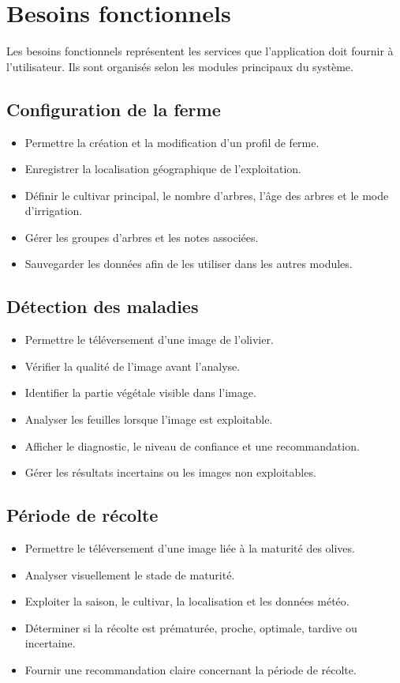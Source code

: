 \documentclass[12pt,a4paper]{report}
\begin{document}
\section{Besoins fonctionnels}

Les besoins fonctionnels représentent les services que l'application doit fournir à l'utilisateur. Ils sont organisés selon les modules principaux du système.

\subsection{Configuration de la ferme}
\begin{itemize}
    \item Permettre la création et la modification d'un profil de ferme.
    \item Enregistrer la localisation géographique de l'exploitation.
    \item Définir le cultivar principal, le nombre d'arbres, l'âge des arbres et le mode d'irrigation.
    \item Gérer les groupes d'arbres et les notes associées.
    \item Sauvegarder les données afin de les utiliser dans les autres modules.
\end{itemize}

\subsection{Détection des maladies}
\begin{itemize}
    \item Permettre le téléversement d'une image de l'olivier.
    \item Vérifier la qualité de l'image avant l'analyse.
    \item Identifier la partie végétale visible dans l'image.
    \item Analyser les feuilles lorsque l'image est exploitable.
    \item Afficher le diagnostic, le niveau de confiance et une recommandation.
    \item Gérer les résultats incertains ou les images non exploitables.
\end{itemize}

\subsection{Période de récolte}
\begin{itemize}
    \item Permettre le téléversement d'une image liée à la maturité des olives.
    \item Analyser visuellement le stade de maturité.
    \item Exploiter la saison, le cultivar, la localisation et les données météo.
    \item Déterminer si la récolte est prématurée, proche, optimale, tardive ou incertaine.
    \item Fournir une recommandation claire concernant la période de récolte.
\end{itemize}
\end{document}
